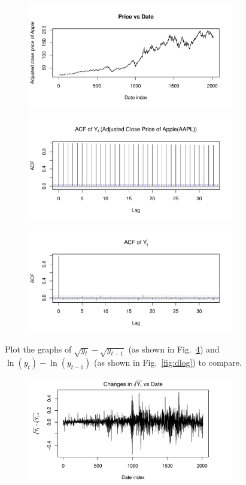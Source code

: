 \documentclass[conference,onecolumn,11pt]{IEEEtran}
\begin{document}
\begin{figure}[htpb]
	\centering
	\includegraphics[width=0.8\textwidth]{pic/Price_vs_Date.pdf}
	\caption{}
	\label{fig:price}
\end{figure}

\begin{figure}[htpb]
	\centering
	\includegraphics[width=0.8\textwidth]{pic/ACF_AdjClosed.pdf}
	\caption{}
	\label{fig:acf1}
\end{figure}

\begin{figure}[htpb]
	\centering
	\includegraphics[width=0.8\textwidth]{pic/ACF_dAdjClosed.pdf}
	\caption{}
	\label{fig:acf2}
\end{figure}

Plot the graphs of $\sqrt{y_t}-\sqrt{y_{t-1}}$ (as shown in Fig.~\ref{fig:dsqrt}) and $\ln(y_t)-\ln(y_{t-1})$ (as shown in Fig.~\ref{fig:dlog}) to compare. 

\begin{figure}[htpb]
	\centering
	\includegraphics[width=0.8\textwidth]{pic/Sqrt_AdjClosed.pdf}
	\caption{}
	\label{fig:dsqrt}
\end{figure}
\end{document}
